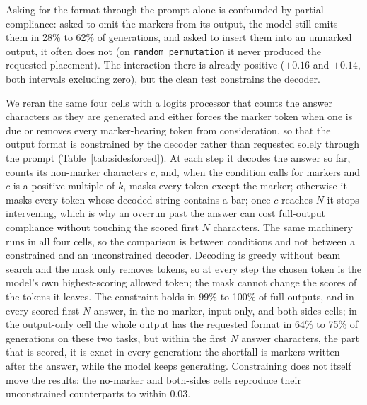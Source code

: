 \documentclass[10pt]{article} %
\newcommand{\task}[1]{\texttt{#1}}
\begin{document}
Asking for the format through the prompt alone is confounded by partial compliance: asked to omit the markers from its output, the model still emits them in 28\% to 62\% of generations, and asked to insert them into an unmarked output, it often does not (on \task{random\_permutation} it never produced the requested placement). The interaction there is already positive ($+0.16$ and $+0.14$, both intervals excluding zero), but the clean test constrains the decoder.

We reran the same four cells with a logits processor that
counts the answer characters as they are generated and either forces the marker token when one is due or removes every marker-bearing token from consideration, so that the output format is constrained by the decoder rather than requested solely through the prompt (Table~\ref{tab:sidesforced}). At each step it decodes the answer so far, counts its non-marker characters $c$, and, when the condition calls for markers and $c$ is a positive multiple of $k$, masks every token except the marker; otherwise it masks every token whose decoded string contains a bar; once $c$ reaches $N$ it stops intervening, which is why an overrun past the answer can cost full-output compliance without touching the scored first $N$ characters. The same machinery runs in all four cells, so the comparison is between conditions and not between a constrained and an unconstrained decoder. Decoding is greedy without beam search and the mask only removes tokens, so at every step the chosen token is the model's own highest-scoring allowed token; the mask cannot change the scores of the tokens it leaves. The constraint holds in 99\% to 100\% of full outputs, and in every scored first-$N$ answer, in the
no-marker, input-only, and both-sides cells; in the output-only cell the whole output has the requested format in 64\% to 75\% of
generations on these two tasks, but within the first $N$ answer characters, the part that is scored, it is exact in every generation: the shortfall is markers written after the answer, while the model keeps generating. Constraining does
not itself move the results: the no-marker and both-sides cells reproduce their unconstrained
counterparts to within 0.03.
\end{document}
